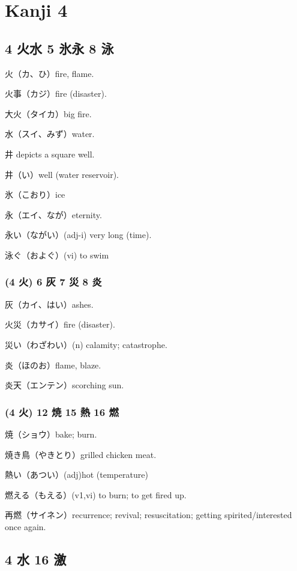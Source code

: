 \chapter{Kanji 4}

\section{4 火水 5 氷永 8 泳}

火（カ、ひ）fire, flame.

火事（カジ）fire (disaster).

大火（タイカ）big fire.

水（スイ、みず）water.

井 depicts a square well.

井（い）well (water reservoir).

氷（こおり）ice

永（エイ、なが）eternity.

永い（ながい）(adj-i) very long (time).

泳ぐ（およぐ）(vi) to swim

\subsection{(4 火) 6 灰 7 災 8 炎}

灰（カイ、はい）ashes.

火災（カサイ）fire (disaster).

災い（わざわい）(n) calamity; catastrophe.

炎（ほのお）flame, blaze.

炎天（エンテン）scorching sun.

\subsection{(4 火) 12 焼 15 熱 16 燃}

焼（ショウ）bake; burn.

焼き鳥（やきとり）grilled chicken meat.

熱い（あつい）(adj)hot (temperature)

燃える（もえる）(v1,vi) to burn; to get fired up.

再燃（サイネン）recurrence; revival; resuscitation;
getting spirited/interested once again.

\section{4 水 16 激}

